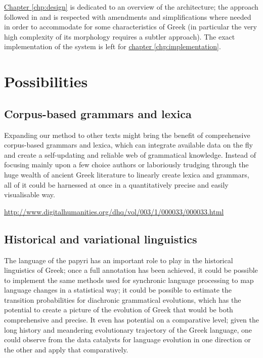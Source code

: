 \hyperref[chp:design]{Chapter \ref*{chp:design}} is dedicated to an
overview of the architecture; the approach followed in
\citet{collobert-2011} and \citet{turian2010word} is respected with
amendments and simplifications where needed in order to accommodate
for some characteristics of Greek (in particular the very high
complexity of its morphology requires a subtler approach). The exact
implementation of the system is left for
\hyperref[chp:implementation]{chapter \ref*{chp:implementation}}.

\section{Possibilities}

\subsection{Corpus-based grammars and lexica}
\label{sec:corpusbasedgrammars}
Expanding our method to other texts might bring the benefit of
comprehensive corpus-based grammars and lexica, which can integrate
available data on the fly and create a self-updating and reliable web
of grammatical knowledge. Instead of focusing mainly upon a few choice
authors or laboriously trudging through the huge wealth of ancient
Greek literature to linearly create lexica and grammars, all of it
could be harnessed at once in a quantitatively precise and easily
visualisable way.

\url{http://www.digitalhumanities.org/dhq/vol/003/1/000033/000033.html}
\cite{bamman2008building,bammandhq2009}

\subsection{Historical and variational linguistics} %
\label{sec:histlinguistics}
The language of the papyri has an important role to play in the
historical linguistics of Greek; once a full annotation has been
achieved, it could be possible to implement the same methods used for
synchronic language processing to map language changes in a
statistical way; it could be possible to estimate the transition
probabilities for diachronic grammatical evolutions, which has the
potential to create a picture of the evolution of Greek that would be
both comprehensive and precise. It even has potential on a comparative
level; given the long history and meandering evolutionary trajectory
of the Greek language, one could observe from the data catalysts for
language evolution in one direction or the other and apply that
comparatively.

